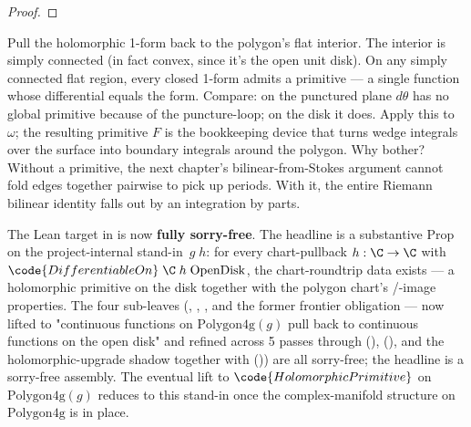 \begin{proof}\leanok\end{proof}

\begin{layman}
Pull the holomorphic 1-form back to the polygon's flat interior.
The interior is simply connected (in fact convex, since it's the
open unit disk). On any simply connected flat region, every
closed 1-form admits a primitive --- a single function whose
differential equals the form. Compare: on the punctured plane
\(d\theta\) has no global primitive because of the puncture-loop;
on the disk it does. Apply this to \(\omega\); the resulting
primitive \(F\) is the bookkeeping device that turns wedge
integrals over the surface into boundary integrals around the
polygon. Why bother? Without a primitive, the next chapter's
bilinear-from-Stokes argument cannot fold edges together pairwise
to pick up periods. With it, the entire Riemann bilinear
identity falls out by an integration by parts.
\end{layman}

\begin{proofsketch}
The Lean target in
 is now
\textbf{fully sorry-free}. The headline
 is a substantive Prop on the
project-internal stand-in
\,\(g\;h\): for every chart-pullback
\(h:\C\to\C\) with \(\code{DifferentiableOn}\;\C\;h\;\mathrm{OpenDisk}\),
the chart-roundtrip data exists --- a holomorphic primitive on the
disk together with the polygon chart's
/-image properties. The four sub-leaves
(,
,
, and the former frontier
obligation  --- now
lifted to "continuous functions on \(\mathrm{Polygon4g}(g)\) pull
back to continuous functions on the open disk" and refined across
5 passes through 
(),
(), and the holomorphic-upgrade shadow
together with 
()) are all sorry-free; the
headline is a sorry-free assembly. The eventual lift to
\(\code{HolomorphicPrimitive}\) on \(\mathrm{Polygon4g}(g)\) reduces
to this stand-in once the complex-manifold structure on
\(\mathrm{Polygon4g}\) is in place.
\end{proofsketch}

